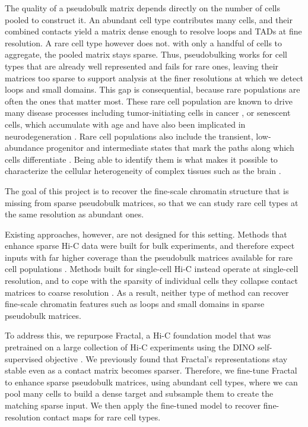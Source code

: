 \documentclass{article}
\begin{document}
The quality of a pseudobulk matrix depends directly on the number of cells pooled to construct it.
An abundant cell type contributes many cells, and their combined contacts yield a matrix dense enough to resolve loops and TADs at fine resolution.
A rare cell type however does not. 
with only a handful of cells to aggregate, the pooled matrix stays sparse.
Thus, pseudobulking works for cell types that are already well represented and fails for rare ones, leaving their matrices too sparse to support analysis at the finer resolutions at which we detect loops and small domains.
This gap is consequential, because rare populations are often the ones that matter most.
These rare cell population are known to drive many disease processes including tumor-initiating cells in cancer \cite{}, or senescent cells, which accumulate with age and have also been implicated in neurodegeneration \cite{}.
Rare cell populations also include the transient, low-abundance progenitor and intermediate states that mark the paths along which cells differentiate \cite{}.
Being able to identify them is what makes it possible to characterize the cellular heterogeneity of complex tissues such as the brain \cite{}.

The goal of this project is to recover the fine-scale chromatin structure that is missing from sparse pseudobulk matrices, so that we can study rare cell types at the same resolution as abundant ones.

Existing approaches, however, are not designed for this setting.
Methods that enhance sparse Hi-C data were built for bulk experiments, and therefore expect inputs with far higher coverage than the pseudobulk matrices available for rare cell populations \cite{}.
Methods built for single-cell Hi-C instead operate at single-cell resolution, and to cope with the sparsity of individual cells they collapse contact matrices to coarse resolution \cite{}.
As a result, neither type of method can recover fine-scale chromatin features such as loops and small domains in sparse pseudobulk matrices.

To address this, we repurpose Fractal, a Hi-C foundation model that was pretrained on a large collection of Hi-C experiments using the DINO self-supervised objective \cite{}.
We previously found that Fractal's representations stay stable even as a contact matrix becomes sparser.
Therefore, we fine-tune Fractal to enhance sparse pseudobulk matrices, using abundant cell types, where we can pool many cells to build a dense target and subsample them to create the matching sparse input.
We then apply the fine-tuned model to recover fine-resolution contact maps for rare cell types.
\end{document}
